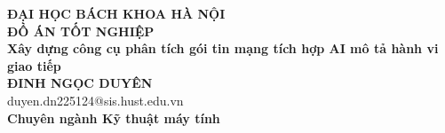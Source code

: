 \documentclass[DoAn.tex]{subfiles}
\begin{document}
\begin{titlepage}
\thispagestyle{empty}
\begin{center}

{\textbf{\large{ĐẠI HỌC BÁCH KHOA HÀ NỘI}}}\\[4cm]

{\textbf{\huge{ĐỒ ÁN TỐT NGHIỆP}}}\\[1cm]
{\textbf{\Large{Xây dựng công cụ phân tích gói tin mạng tích hợp AI mô tả hành vi giao tiếp}}}\\[1cm]

{\textbf{\large{ĐINH NGỌC DUYÊN}}}\\
{\large{duyen.dn225124@sis.hust.edu.vn}}\\[0.5cm]

{\textbf{\large{Chuyên ngành Kỹ thuật máy tính}}}\\

\vspace{4cm}
\par
\end{center}

\end{titlepage}
\end{document}
